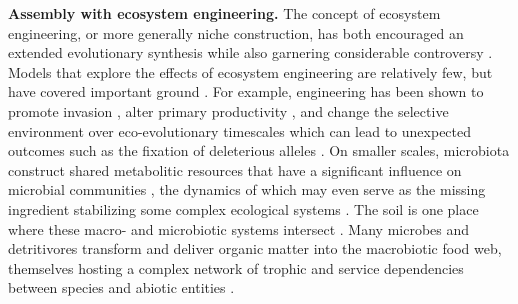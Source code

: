\documentclass[twocolumn,preprintnumbers,amsmath,amssymb,superscriptaddress,linenumbers]{revtex4-1}
\begin{document}
\begin{bibunit}
\vspace{0mm}
\noindent \textbf{Assembly with ecosystem engineering.}
The concept of ecosystem engineering, or more generally niche construction, has both encouraged an extended evolutionary synthesis \cite{Laland2015} while also garnering considerable controversy \cite{Gupta2017,Feldman2017}.
Models that explore the effects of ecosystem engineering are relatively few, but have covered important ground \cite{Hastings2007,OdlingSmee2013}.
For example, engineering has been shown to promote invasion \cite{Cuddington2004}, alter primary productivity \cite{Wright2004}, and change the selective environment over eco-evolutionary timescales \cite{Kylafis2008,Krakauer2009} which can lead to unexpected outcomes such as the fixation of deleterious alleles \cite{Laland1999}.
On smaller scales, microbiota construct shared metabolitic resources that have a significant influence on microbial communities \cite{Kallus2017}, the dynamics of which may even serve as the missing ingredient stabilizing some complex ecological systems \cite{Butler2018}.
The soil is one place where these macro- and microbiotic systems intersect \cite{Amundson2015}.
Many microbes and detritivores transform and deliver organic matter into the macrobiotic food web, themselves hosting a complex network of trophic and service dependencies between species and abiotic entities \cite{Gutierrez2006,Jouquet2006}.



\end{bibunit}
\end{document}
